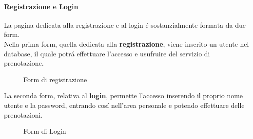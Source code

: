 \documentclass{article}
\begin{document}
\paragraph*{Registrazione e Login}
La pagina dedicata alla registrazione e al login é sostanzialmente formata da due form.\\
Nella prima form, quella dedicata alla \textbf{registrazione}, viene inserito un utente nel database, il quale potrá effettuare l'accesso e usufruire del servizio di prenotazione.
\begin{figure}[H]
	\centering
	\caption{Form di registrazione}
\end{figure}
La seconda form, relativa al \textbf{login}, permette l'accesso inserendo il proprio nome utente e la password, entrando cosí nell'area personale e potendo effettuare delle prenotazioni.
\begin{figure}[H]
	\centering
	\caption{Form di Login}
\end{figure}
\end{document}
